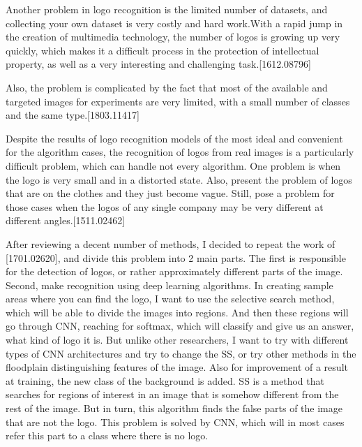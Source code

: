 \vspace{-0.5cm}
\par Another problem in logo recognition is the limited number of datasets, and collecting your own dataset is very costly and hard work.With a rapid jump in the creation of multimedia technology, the number of logos is growing up very quickly, which makes it a difficult process in the protection of intellectual property, as well as a very interesting and challenging task.[1612.08796] 

\vspace{-0.5cm}
\par Also, the problem is complicated by the fact that most of the available and targeted images for experiments are very limited, with a small number of classes and the same type.[1803.11417] 


\vspace{-0.5cm}
\par Despite the results of logo recognition models of the most ideal and convenient for the algorithm cases, the recognition of logos from real images is a particularly difficult problem, which can handle not every algorithm. One problem is when the logo is very small and in a distorted state. Also, present the problem of logos that are on the clothes and they just become vague. Still, pose a problem for those cases when the logos of any single company may be very different at different angles.[1511.02462]


\vspace{-0.5cm}
\par After reviewing a decent number of methods, I decided to repeat the work of [1701.02620], and divide this problem into 2 main parts. The first is responsible for the detection of logos, or rather approximately different parts of the image. Second, make recognition using deep learning algorithms. In creating sample areas where you can find the logo, I want to use the selective search method, which will be able to divide the images into regions. And then these regions will go through CNN, reaching for softmax, which will classify and give us an answer, what kind of logo it is. But unlike other researchers, I want to try with different types of CNN architectures and try to change the SS, or try other methods in the floodplain distinguishing features of the image. Also for improvement of a result at training, the new class of the background is added. SS is a method that searches for regions of interest in an image that is somehow different from the rest of the image. But in turn, this algorithm finds the false parts of the image that are not the logo. This problem is solved by CNN, which will in most cases refer this part to a class where there is no logo.


